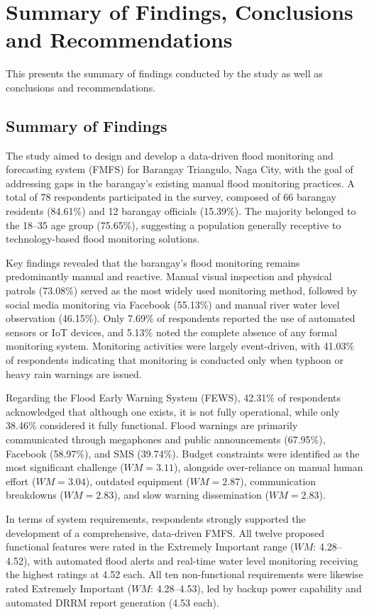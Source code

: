 \documentclass{research}
\begin{document}
\section{Summary of Findings, Conclusions and Recommendations}
This presents the summary of findings conducted by the study as well as conclusions
and recommendations.

\subsection{Summary of Findings}

The study aimed to design and develop a data-driven flood monitoring and forecasting
system (FMFS) for Barangay Triangulo, Naga City, with the goal of addressing gaps in
the barangay's existing manual flood monitoring practices. A total of 78 respondents
participated in the survey, composed of 66 barangay residents (84.61\%) and 12
barangay officials (15.39\%). The majority belonged to the 18--35 age group (75.65\%),
suggesting a population generally receptive to technology-based flood monitoring
solutions.

Key findings revealed that the barangay's flood monitoring remains predominantly
manual and reactive. Manual visual inspection and physical patrols (73.08\%) served as
the most widely used monitoring method, followed by social media monitoring via
Facebook (55.13\%) and manual river water level observation (46.15\%). Only 7.69\% of
respondents reported the use of automated sensors or IoT devices, and 5.13\% noted the
complete absence of any formal monitoring system. Monitoring activities were largely
event-driven, with 41.03\% of respondents indicating that monitoring is conducted only
when typhoon or heavy rain warnings are issued.

Regarding the Flood Early Warning System (FEWS), 42.31\% of respondents
acknowledged that although one exists, it is not fully operational, while only 38.46\%
considered it fully functional. Flood warnings are primarily communicated through
megaphones and public announcements (67.95\%), Facebook (58.97\%), and SMS
(39.74\%). Budget constraints were identified as the most significant challenge
($WM = 3.11$), alongside over-reliance on manual human effort ($WM = 3.04$),
outdated equipment ($WM = 2.87$), communication breakdowns ($WM = 2.83$), and
slow warning dissemination ($WM = 2.83$).

In terms of system requirements, respondents strongly supported the development of a
comprehensive, data-driven FMFS. All twelve proposed functional features were rated
in the Extremely Important range ($WM$: 4.28--4.52), with automated flood alerts and
real-time water level monitoring receiving the highest ratings at 4.52 each. All ten
non-functional requirements were likewise rated Extremely Important ($WM$:
4.28--4.53), led by backup power capability and automated DRRM report generation
(4.53 each).
\end{document}
